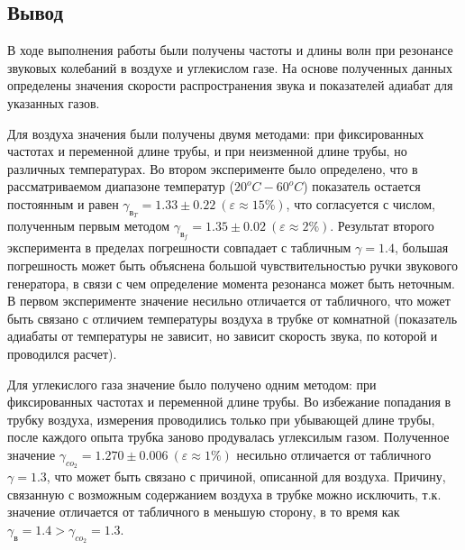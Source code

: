 \documentclass[12pt,a4paper]{article}
\begin{document}
\subsection*{Вывод}
В ходе выполнения работы были получены частоты и длины волн при резонансе звуковых колебаний в воздухе и углекислом газе. На основе полученных данных определены значения скорости распространения звука и показателей адиабат для указанных газов.

Для воздуха значения были получены двумя методами: при фиксированных частотах и переменной длине трубы, и при неизменной длине трубы, но различных температурах. Во втором эксперименте было определено, что в рассматриваемом диапазоне температур ($20^oC-60^oC$) показатель остается постоянным и равен $\gamma_{в_T}=1.33\pm0.22\ (\varepsilon \approx 15\%)$, что согласуется с числом, полученным первым методом $\gamma_{в_f}=1.35\pm0.02\ (\varepsilon \approx 2\%)$. Результат второго эксперимента в пределах погрешности совпадает с табличным $\gamma=1.4$, большая погрешность может быть объяснена большой чувствительностью ручки звукового генератора, в связи с чем определение момента резонанса может быть неточным. В первом эксперименте значение несильно отличается от табличного, что может быть связано с отличием температуры воздуха в трубке от комнатной (показатель адиабаты от температуры не зависит, но зависит скорость звука, по которой и проводился расчет).

Для углекислого газа значение было получено одним методом: при фиксированных частотах и переменной длине трубы. Во избежание попадания в трубку воздуха, измерения проводились только при убывающей длине трубы, после каждого опыта трубка заново продувалась углексилым газом. Полученное значение $\gamma_{co_2} = 1.270\pm0.006\ (\varepsilon \approx 1\%)$ несильно отличается от табличного $\gamma = 1.3$, что может быть связано с причиной, описанной для воздуха. Причину, связанную с возможным содержанием воздуха в трубке можно исключить, т.к. значение отличается от табличного в меньшую сторону, в то время как $\gamma_в=1.4>\gamma_{co_2}=1.3$.
\end{document}
